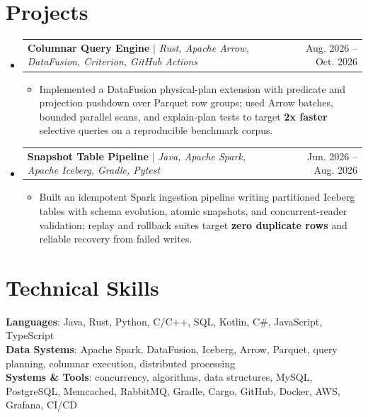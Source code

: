 \documentclass[letterpaper,11pt]{article}
\makeatletter
\newcommand{\resumeItem}[1]{
  \item\small{
    {#1 \vspace{-2pt}}
  }
}
\newcommand{\resumeProjectHeading}[2]{
    \item
    \begin{tabular*}{0.97\textwidth}{l@{\extracolsep{\fill}}r}
      \small#1 & #2 \\
    \end{tabular*}\vspace{-7pt}
}
\newcommand{\resumeSubHeadingListStart}{\begin{itemize}[leftmargin=0.15in, label={}]}
\newcommand{\resumeSubHeadingListEnd}{\end{itemize}}
\newcommand{\resumeItemListStart}{\begin{itemize}}
\newcommand{\resumeItemListEnd}{\end{itemize}\vspace{-5pt}}
\makeatother
\begin{document}
\section{Projects}
\resumeSubHeadingListStart
\resumeProjectHeading
{\textbf{Columnar Query Engine} $|$ \emph{Rust, Apache Arrow, DataFusion, Criterion, GitHub Actions}}{Aug. 2026 -- Oct. 2026}
\resumeItemListStart
\resumeItem{Implemented a DataFusion physical-plan extension with predicate and projection pushdown over Parquet row groups; used Arrow batches, bounded parallel scans, and explain-plan tests to target \textbf{2x faster} selective queries on a reproducible benchmark corpus.}
\resumeItemListEnd
\resumeProjectHeading
{\textbf{Snapshot Table Pipeline} $|$ \emph{Java, Apache Spark, Apache Iceberg, Gradle, Pytest}}{Jun. 2026 -- Aug. 2026}
\resumeItemListStart
\resumeItem{Built an idempotent Spark ingestion pipeline writing partitioned Iceberg tables with schema evolution, atomic snapshots, and concurrent-reader validation; replay and rollback suites target \textbf{zero duplicate rows} and reliable recovery from failed writes.}
\resumeItemListEnd
\resumeSubHeadingListEnd

\section{Technical Skills}
\begin{itemize}[leftmargin=0.15in, label={}]
  \small{\item{
        \textbf{Languages}{: Java, Rust, Python, C/C++, SQL, Kotlin, C\#, JavaScript, TypeScript} \\
        \textbf{Data Systems}{: Apache Spark, DataFusion, Iceberg, Arrow, Parquet, query planning, columnar execution, distributed processing} \\
        \textbf{Systems \& Tools}{: concurrency, algorithms, data structures, MySQL, PostgreSQL, Memcached, RabbitMQ, Gradle, Cargo, GitHub, Docker, AWS, Grafana, CI/CD}
        }}
\end{itemize}
\end{document}

